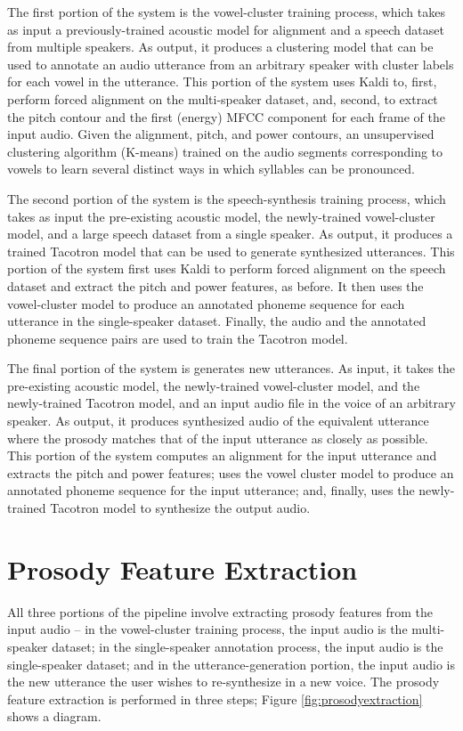 \documentclass{article}
\begin{document}
The first portion of the system is the vowel-cluster training process, which takes as input a previously-trained acoustic model for alignment and a speech dataset from multiple speakers. As output, it produces a clustering model that can be used to annotate an audio utterance from an arbitrary speaker with cluster labels for each vowel in the utterance. This portion of the system uses Kaldi to, first, perform forced alignment on the multi-speaker dataset, and, second, to extract the pitch contour and the first (energy) MFCC component for each frame of the input audio. Given the alignment, pitch, and power contours, an unsupervised clustering algorithm (K-means) trained on the audio segments corresponding to vowels to learn several distinct ways in which syllables can be pronounced.

The second portion of the system is the speech-synthesis training process, which takes as input the pre-existing acoustic model, the newly-trained vowel-cluster model, and a large speech dataset from a single speaker. As output, it produces a trained Tacotron model that can be used to generate synthesized utterances. This portion of the system first uses Kaldi to perform forced alignment on the speech dataset and extract the pitch and power features, as before. It then uses the vowel-cluster model to produce an annotated phoneme sequence for each utterance in the single-speaker dataset. Finally, the audio and the annotated phoneme sequence pairs are used to train the Tacotron model.

The final portion of the system is generates new utterances. As input, it takes the pre-existing acoustic model, the newly-trained vowel-cluster model, and the newly-trained Tacotron model, and an input audio file in the voice of an arbitrary speaker. As output, it produces synthesized audio of the equivalent utterance where the prosody matches that of the input utterance as closely as possible. This portion of the system computes an alignment for the input utterance and extracts the pitch and power features; uses the vowel cluster model to produce an annotated phoneme sequence for the input utterance; and, finally, uses the newly-trained Tacotron model to synthesize the output audio.

\section{Prosody Feature Extraction}
\label{sec:prosody}

All three portions of the pipeline involve extracting prosody features from the input audio -- in the vowel-cluster training process, the input audio is the multi-speaker dataset; in the single-speaker annotation process, the input audio is the single-speaker dataset; and in the utterance-generation portion, the input audio is the new utterance the user wishes to re-synthesize in a new voice.
The prosody feature extraction is performed in three steps; Figure \ref{fig:prosodyextraction} shows a diagram.
\end{document}
